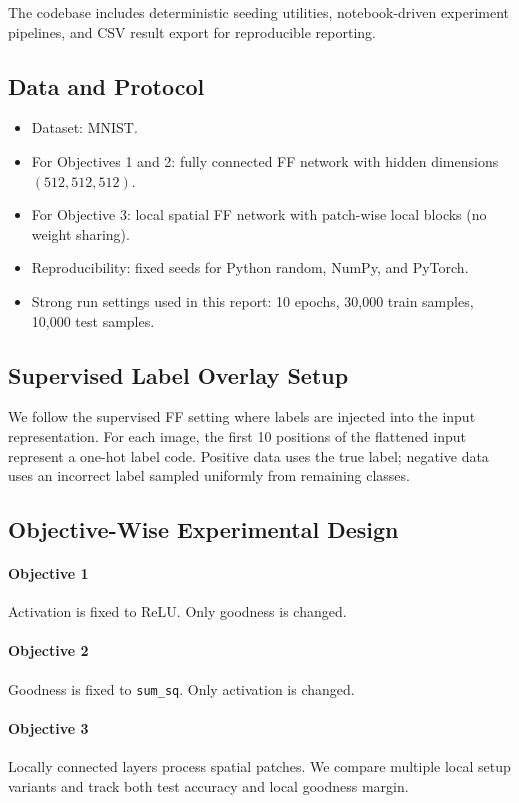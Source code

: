 \documentclass[sigconf]{acmart}
\begin{document}
The codebase includes deterministic seeding utilities, notebook-driven experiment pipelines, and CSV result export for reproducible reporting.

\subsection{Data and Protocol}
\begin{itemize}
  \item Dataset: MNIST.
  \item For Objectives 1 and 2: fully connected FF network with hidden dimensions $(512, 512, 512)$.
  \item For Objective 3: local spatial FF network with patch-wise local blocks (no weight sharing).
  \item Reproducibility: fixed seeds for Python random, NumPy, and PyTorch.
  \item Strong run settings used in this report: 10 epochs, 30,000 train samples, 10,000 test samples.
\end{itemize}

\subsection{Supervised Label Overlay Setup}
We follow the supervised FF setting where labels are injected into the input representation. For each image, the first 10 positions of the flattened input represent a one-hot label code. Positive data uses the true label; negative data uses an incorrect label sampled uniformly from remaining classes.

\subsection{Objective-Wise Experimental Design}
\paragraph{Objective 1}
Activation is fixed to ReLU. Only goodness is changed.

\paragraph{Objective 2}
Goodness is fixed to \texttt{sum\_sq}. Only activation is changed.

\paragraph{Objective 3}
Locally connected layers process spatial patches. We compare multiple local setup variants and track both test accuracy and local goodness margin.
\end{document}

